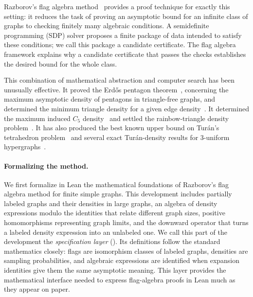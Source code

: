 \documentclass{article}
\begin{document}
Razborov's flag algebra method~\cite{razborov2007flag} provides a proof technique
for exactly this setting: it reduces the task of proving an asymptotic bound
for an infinite class of graphs to checking finitely many algebraic conditions.
A semidefinite programming (SDP) solver proposes a finite package of data
intended to satisfy these conditions; we call this package a candidate
certificate.  The flag algebra
framework explains why a candidate certificate that passes the checks
establishes the desired bound for the whole class.

This combination of mathematical abstraction and computer search has been
unusually effective.  It proved the Erd\H{o}s pentagon
theorem~\cite{hatami2012,grzesik2012}, concerning the maximum asymptotic
density of pentagons in triangle-free graphs, and determined the minimum
triangle density for a given edge density~\cite{razborov2008triangles}.  It
determined the maximum induced $C_5$ density~\cite{balogh2016induced5} and
settled the rainbow-triangle density problem~\cite{balogh2017rainbow}.  It has
also produced the best known upper bound on Tur\'an's tetrahedron
problem~\cite{razborov2010tetrahedron} and several exact
Tur\'an-density results for 3-uniform hypergraphs~\cite{baber2012turan}.

\paragraph{Formalizing the method.}
We first formalize in Lean the mathematical foundations of Razborov's flag
algebra method for finite simple graphs.  This development includes partially
labeled graphs and their densities in large graphs, an algebra of density
expressions modulo the identities that relate different graph sizes, positive
homomorphisms representing graph limits, and the downward operator that turns
a labeled density expression into an unlabeled one.  We call this part of the
development the \emph{specification layer} ().  Its
definitions follow the standard mathematics closely: flags are isomorphism
classes of labeled graphs, densities are sampling probabilities, and algebraic
expressions are identified when expansion identities give them the same
asymptotic meaning.  This layer provides the mathematical interface needed to
express flag-algebra proofs in Lean much as they appear on paper.
\end{document}
